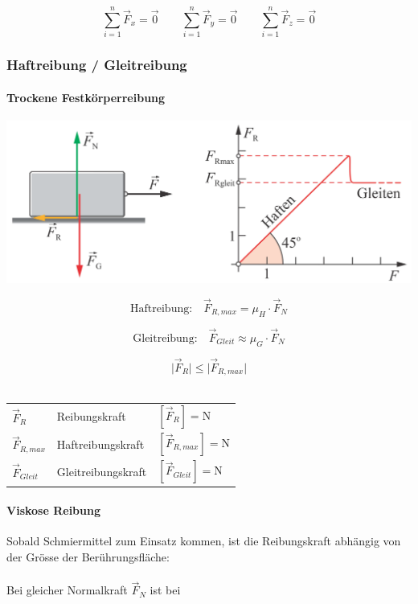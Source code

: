 	$$ \boxed{ \sum \limits_{i = 1}^n \vec{F}_x = \vec{0}  \qquad  \sum \limits_{i = 1}^n \vec{F}_y = \vec{0}  \qquad  \sum \limits_{i = 1}^n \vec{F}_z = \vec{0} } $$ 
		
		
		
	\subsubsection{Haftreibung / Gleitreibung}
	
		\paragraph{Trockene Festkörperreibung}
	
	
		\includegraphics[width=0.7\linewidth]{Bilder/reibung} \\
	
		\begin{minipage}{0.65\linewidth}
		$$ \boxed{ \text{Haftreibung:} \quad \vec{F}_{R,max} = \mu_H \cdot \vec{F}_N } $$ 
		
		$$ \boxed{ \text{Gleitreibung:} \quad \vec{F}_{Gleit} \approx \mu_G \cdot \vec{F}_N } $$ 
		\end{minipage}
		\hfill
		\begin{minipage}{0.3\linewidth}
		$$ \boxed{ \vert \vec{F}_R \vert \leq \vert \vec{F}_{R,max} \vert } $$ \\
		\end{minipage}
	
		
		\begin{tabular}{lll}
		$\vec{F}_R$ & Reibungskraft & $[\vec{F}_R] = \mathrm{N}$ \\
		$\vec{F}_{R,max}$ & Haftreibungskraft & $[\vec{F}_{R,max}] = \mathrm{N}$ \\
		$\vec{F}_{Gleit}$ & Gleitreibungskraft & $[\vec{F}_{Gleit}] = \mathrm{N}$ \\
		\end{tabular}
	
		

		
		
		
		\paragraph{Viskose Reibung}
		Sobald Schmiermittel zum Einsatz kommen, ist die Reibungskraft abhängig von der Grösse der Berührungsfläche: \\
		\\
		Bei gleicher Normalkraft $\vec{F}_N$ ist bei 
		
